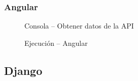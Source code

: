 \documentclass{article}
\begin{document}
  \subsubsection{Angular}
  \begin{figure}[H]
    \centering
    \caption{Consola -- Obtener datos de la API}
  \end{figure}
  \begin{figure}[H]
    \centering
    \caption{Ejecución -- Angular}
  \end{figure}
  
  
  \subsection{Django}
\end{document}
